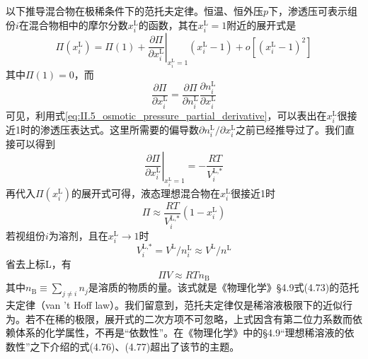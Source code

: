 \documentclass[main.tex]{subfiles}
\begin{document}
以下推导混合物在极稀条件下的范托夫定律。恒温、恒外压$p$下，渗透压可表示组份$i$在混合物相中的摩尔分数$x_i^\text{L}$的函数，其在$x_i^\text{L}=1$附近的展开式是
\[\Pi\left(x_i^\text{L}\right)=\Pi\left(1\right)+\left.\frac{\partial\Pi}{\partial x_i^\text{L}}\right|_{x_i^\text{L}=1}\left(x_i^\text{L}-1\right)+o\left[\left(x_i^\text{L}-1\right)^2\right]\]
其中$\Pi\left(1\right)=0$，而
\[\frac{\partial \Pi}{\partial x_i^\text{L}}=\frac{\partial\Pi}{\partial n_i^\text{L}}\frac{\partial n_i^\text{L}}{\partial x_i^\text{L}}\]
可见，利用式\eqref{eq:II.5_osmotic_pressure_partial_derivative}，可以表出在$x_i^\text{L}$很接近1时的渗透压表达式。这里所需要的偏导数$\partial n_i^\text{L}/\partial x_i^\text{L}$之前已经推导过了。我们直接可以得到
\[\left.\frac{\partial \Pi}{\partial x_i^\text{L}}\right|_{x_i^\text{L}=1}=-\frac{RT}{V_i^\text{L,*}}\]
再代入$\Pi\left(x_i^\text{L}\right)$的展开式可得，液态理想混合物在$x_i^\text{L}$很接近1时
\[\Pi\approx\frac{RT}{V_i^\text{L,*}}\left(1-x_i^\text{L}\right)\]
若视组份$i$为溶剂，且在$x_i^\text{L}\rightarrow 1$时
\[V_i^\text{L,*}=V^\text{L}/n_i^\text{L}\approx V^\text{L}/n^\text{L}\]
省去上标L，有
\[\Pi V\approx RTn_\text{B}\]
其中$n_\text{B}\equiv\sum_{j\neq i}n_j$是溶质的物质的量。该式就是《物理化学》\S4.9式(4.73)的范托夫定律（van 't Hoff law）。我们留意到，范托夫定律仅是稀溶液极限下的近似行为。若不在稀的极限，展开式的二次方项不可忽略，上式因含有第二位力系数而依赖体系的化学属性，不再是“依数性”。在《物理化学》中的\S4.9“理想稀溶液的依数性”之下介绍的式(4.76)、(4.77)超出了该节的主题。
\end{document}
